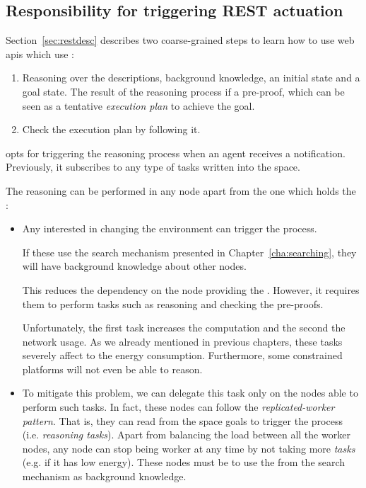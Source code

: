 \subsection{Responsibility for triggering REST actuation}
\label{sec:responsible_proof}

Section~\ref{sec:restdesc} describes two coarse-grained steps to learn how to use web \acsp{api} which use \restdesc{}:
\begin{enumerate}
  \item Reasoning over the descriptions, background knowledge, an initial state and a goal state.
        The result of the reasoning process if a pre-proof, which can be seen as a tentative \emph{execution plan} to achieve the goal.
  \item Check the execution plan by following it.
\end{enumerate}


\implMix{} opts for triggering the reasoning process when an agent receives a notification.
Previously, it subscribes to any type of tasks written into the space.


The reasoning can be performed in any node apart from the one which holds the \Space{}:

\begin{itemize}
  \item Any \consumer{} interested in changing the environment can trigger the process.
	\begin{sloppypar}If these \consumers{} use the search mechanism presented in Chapter~\ref{cha:searching}, they will have background knowledge about other nodes.\end{sloppypar}
	This reduces the dependency on the node providing the \coordspace{}.
	However, it requires them to perform tasks such as reasoning and checking the pre-proofs.
	
	Unfortunately, the first task increases the computation and the second the network usage.
	As we already mentioned in previous chapters, these tasks severely affect to the energy consumption.
	Furthermore, some constrained platforms will not even be able to reason.
	
  \item To mitigate this problem, we can delegate this task only on the nodes able to perform such tasks.
	In fact, these nodes can follow the \emph{replicated-worker pattern}.
	That is, they can read from the space goals to trigger the process (i.e. \emph{reasoning tasks}).
	Apart from balancing the load between all the worker nodes, any node can stop being worker at any time by not taking more \emph{tasks} (e.g. if it has low energy).
	These nodes must be \consumers{} to use the \clues{} from the search mechanism as background knowledge.
\end{itemize}



